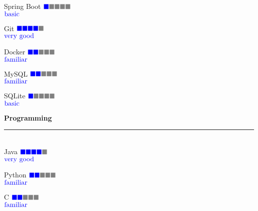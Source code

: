 \documentclass{article}
\begin{document}
\begin{minipage}{0.3\linewidth}
  \large Spring Boot \hfill $\color{blue} \blacksquare\color{gray} \blacksquare \color{gray} \blacksquare \color{gray} \blacksquare  \color{gray} \blacksquare$  \\[-0.8mm]
  \null\hfill \small{ $\color{blue} \textnormal{basic}$}

  \large Git \hfill $\color{blue} \blacksquare\color{blue} \blacksquare \color{blue} \blacksquare \color{blue} \blacksquare  \color{gray} \blacksquare$  \\[-0.8mm]
  \null\hfill \small{ $\color{blue} \textnormal{very good}$}

  \large Docker \hfill $\color{blue} \blacksquare\color{blue} \blacksquare \color{gray} \blacksquare \color{gray} \blacksquare  \color{gray} \blacksquare$  \\[-0.8mm]
  \null\hfill \small{ $\color{blue} \textnormal{familiar}$}

  \large MySQL \hfill $\color{blue} \blacksquare\color{blue} \blacksquare \color{gray} \blacksquare \color{gray} \blacksquare  \color{gray} \blacksquare$  \\[-0.8mm]
  \null\hfill \small{ $\color{blue} \textnormal{familiar}$}

  \large SQLite \hfill $\color{blue} \blacksquare\color{gray} \blacksquare \color{gray} \blacksquare \color{gray} \blacksquare  \color{gray} \blacksquare$  \\[-0.8mm]
  \null\hfill \small{ $\color{blue} \textnormal{basic}$}

  \vspace{0.3cm}
  \textbf{\Large{\color{BlueViolet}Programming}}\\[-0.25cm]
  {\color{BlueViolet} \rule{\linewidth}{0.1mm} }\\
  \large Java \hfill $\color{blue} \blacksquare\color{blue} \blacksquare \color{blue} \blacksquare \color{blue} \blacksquare  \color{gray} \blacksquare$  \\[-0.8mm]
  \null\hfill \small{ $\color{blue} \textnormal{very good}$}

  \large Python \hfill $\color{blue} \blacksquare\color{blue} \blacksquare \color{gray} \blacksquare \color{gray} \blacksquare  \color{gray} \blacksquare$  \\[-0.8mm]
  \null\hfill \small{ $\color{blue} \textnormal{familiar}$}

  \large C \hfill $\color{blue} \blacksquare \color{blue} \blacksquare \color{gray} \blacksquare \color{gray} \blacksquare  \color{gray} \blacksquare$  \\[-0.8mm]
  \null\hfill \small{ $\color{blue} \textnormal{familiar}$}


\end{minipage}
\end{document}
